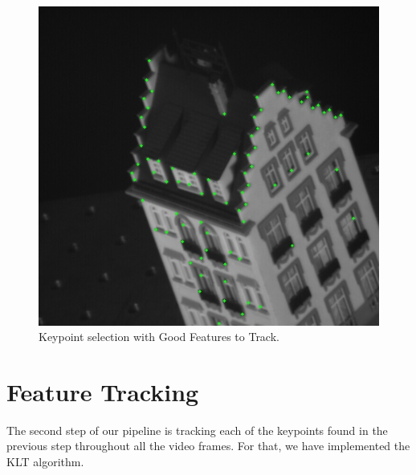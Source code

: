 \documentclass[]{IEEEtran}
\begin{document}
\begin{figure}[ht]
  \includegraphics[width=\linewidth]{./figures/klt/good_features.jpg}
  \caption{Keypoint selection with Good Features to Track.}
  \label{fig:good_features}
\end{figure}







\section{Feature Tracking}
The second step of our pipeline is tracking each of the keypoints found in the previous step throughout all the video frames. For that, we have implemented the KLT algorithm.
\end{document}
